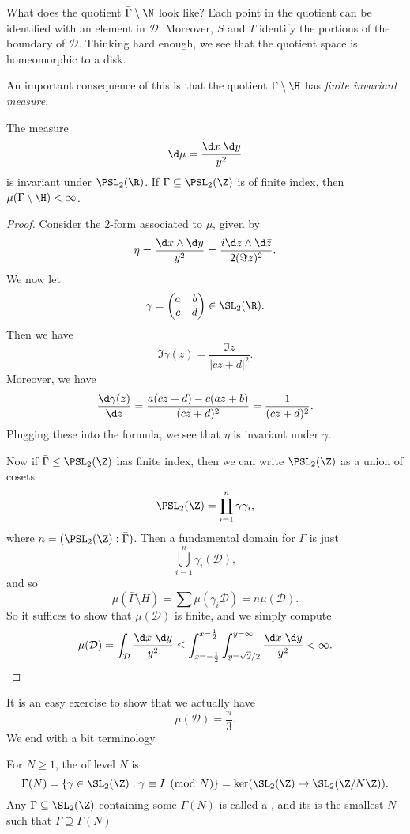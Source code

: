 \documentclass[a4paper]{article}
\begin{document}
What does the quotient $\bar{\Gamma}\setminus \N$ look like? Each point in the quotient can be identified with an element in $\mathcal{D}$. Moreover, $S$ and $T$ identify the portions of the boundary of $\mathcal{D}$. Thinking hard enough, we see that the quotient space is homeomorphic to a disk.

An important consequence of this is that the quotient $\Gamma \setminus \H$ has \emph{finite invariant measure}.
\begin{prop}
  The measure
  \[
    \d \mu = \frac{\d x\;\d y}{y^2}
  \]
  is invariant under $\PSL_2(\R)$. If $\Gamma \subseteq \PSL_2(\Z)$ is of finite index, then $\mu(\Gamma\setminus \H) < \infty$.
\end{prop}

\begin{proof}
  Consider the $2$-form associated to $\mu$, given by
  \[
    \eta = \frac{\d x \wedge \d y}{y^2} = \frac{i \d z \wedge \d \bar{z}}{2 (\Im z)^2}.
  \]
  We now let
  \[
    \gamma =
    \begin{pmatrix}
      a & b\\
      c & d
    \end{pmatrix} \in \SL_2(\R).
  \]
  Then we have
  \[
    \Im \gamma(z) = \frac{\Im z}{|cz + d|^2}.
  \]
  Moreover, we have
  \[
    \frac{\d \gamma(z)}{\d z} = \frac{a(cz + d) - c(az + b)}{(cz + d)^2} = \frac{1}{(cz + d)^2}.
  \]
  Plugging these into the formula, we see that $\eta$ is invariant under $\gamma$.

  Now if $\bar\Gamma \leq \PSL_2(\Z)$ has finite index, then we can write $\PSL_2(\Z)$ as a union of cosets
  \[
    \PSL_2(\Z) = \coprod_{i = 1}^n \bar\gamma \gamma_i,
  \]
  where $n = (\PSL_2(\Z): \bar\Gamma)$. Then a fundamental domain for $\bar\Gamma$ is just
  \[
    \bigcup_{i = 1}^n \gamma_i(\mathcal{D}),
  \]
  and so
  \[
    \mu(\bar\Gamma \setminus H) = \sum \mu(\gamma_i \mathcal{D}) = n \mu(\mathcal{D}).
  \]
  So it suffices to show that $\mu(\mathcal{D})$ is finite, and we simply compute
  \[
    \mu(\mathcal{D}) = \int_\mathcal{D} \frac{\d x\; \d y}{y^2} \leq \int_{x = -\frac{1}{2}}^{x = \frac{1}{2}}\int_{y = \sqrt{2}/2}^{y = \infty} \frac{\d x\;\d y}{y^2} < \infty.
  \]
\end{proof}
It is an easy exercise to show that we actually have
\[
  \mu(\mathcal{D}) = \frac{\pi}{3}.
\]
We end with a bit terminology.
\begin{defi}
  For $N \geq 1$, the  of level $N$ is
  \[
    \Gamma(N) = \{\gamma \in \SL_2(\Z) : \gamma \equiv I \pmod N\} = \ker (\SL_2(\Z) \to \SL_2(\Z/N\Z)).
  \]
  Any $\Gamma \subseteq \SL_2(\Z)$ containing some $\Gamma(N)$ is called a , and its  is the smallest $N$ such that $\Gamma \supseteq \Gamma(N)$
\end{defi}
\end{document}

